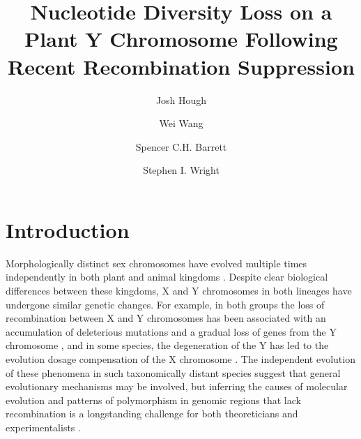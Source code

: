 \documentclass[9pt,twocolumn,twoside]{gsajnl}
\title{Nucleotide Diversity Loss on a Plant Y Chromosome Following Recent Recombination Suppression}
\author[$\ast$,$\dagger$,1]{Josh Hough}
\author[$\dagger$]{Wei Wang}
\author[$\dagger$]{Spencer C.H. Barrett}
\author[$\dagger$]{Stephen I. Wright}
\affil[$\ast$]{Department of Plant Sciences, University of California, Davis}
\affil[$\dagger$]{Department of Ecology and Evolutionary Biology, University of Toronto}
\begin{document}
\maketitle
\thispagestyle{firststyle}
\marginmark
\firstpagefootnote
{}
\vspace{-11pt}

\section*{Introduction}

\lettrine[lines=2]{\color{color2}M}{}orphologically distinct sex chromosomes have evolved multiple times independently in both plant and animal kingdoms \citep{westergaard1958,ohno1967,bull1983,charlesworth1991}. Despite clear biological differences between these kingdoms, X and Y chromosomes in both lineages have undergone similar genetic changes. For example, in both groups the loss of recombination between X and Y chromosomes has been associated with an accumulation of deleterious mutations and a gradual loss of genes from the Y chromosome \citep{hough2014,bergero2015,bachtrog2013NRG}, and in some species, the degeneration of the Y has led to the evolution dosage compensation of the X chromosome \citep{charlesworth1996CB,muyle2012,mank2013sex,papadopulos2015}. The independent evolution of these phenomena in such taxonomically distant species suggest that general evolutionary mechanisms may be involved, but inferring the causes of molecular evolution and patterns of polymorphism in genomic regions that lack recombination is a longstanding challenge for both theoreticians and experimentalists \citep{charlesworth1978,feldman1980evolution,barton1995general,charlesworth1996CB,otto1997deleterious,charlesworth2000degeneration,mcvean2000effects}.
\end{document}
